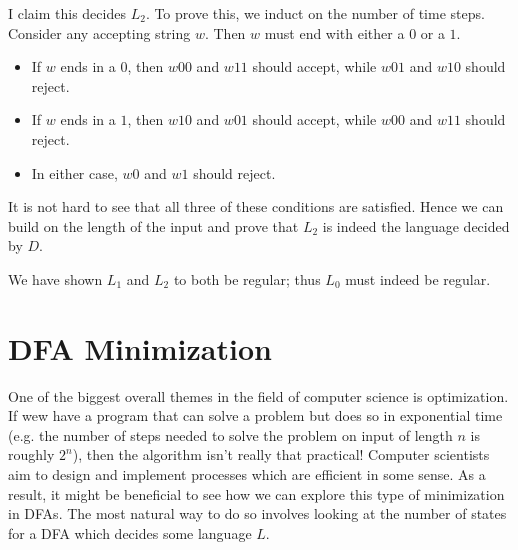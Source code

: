 \documentclass[11pt]{article}
\newcounter{enum}
\begin{document}
\begin{enumerate}
I claim this decides $L_2$.  To prove this, we induct on the number of time steps.  Consider any accepting string $w$.  Then $w$ must end with either a $0$ or a $1$.

\begin{itemize}

\item If $w$ ends in a $0$, then $w00$ and $w11$ should accept, while $w01$ and $w10$ should reject.

\item If $w$ ends in a $1$, then $w10$ and $w01$ should accept, while $w00$ and $w11$ should reject.

\item In either case, $w0$ and $w1$ should reject.

\end{itemize}

It is not hard to see that all three of these conditions are satisfied.  Hence we can build on the length of the input and prove that $L_2$ is indeed the language decided by $D$.

\par We have shown $L_1$ and $L_2$ to both be regular; thus $L_0$ must indeed be regular.

\end{enumerate}

\section{DFA Minimization}

\par One of the biggest overall themes in the field of computer science is optimization.  If wew have a program that can solve a problem but does so in exponential time (e.g. the number of steps needed to solve the problem on input of length $n$ is roughly $2^n$), then the algorithm isn't really that practical!  Computer scientists aim to design and implement processes which are efficient in some sense.  As a result, it might be beneficial to see how we can explore this type of minimization in DFAs.  The most natural way to do so involves looking at the number of states for a DFA which decides some language $L$. 
\end{document}
